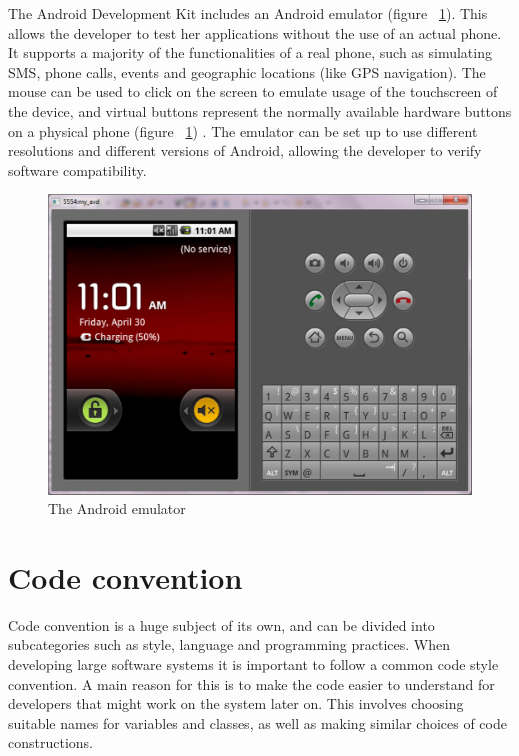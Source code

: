 The Android Development Kit includes an Android emulator (figure ~\ref{fig:androidEmulator}). This allows the developer to test her applications without the use of an actual phone. It supports a majority of the functionalities of a real phone, such as simulating SMS, phone calls, events and geographic locations (like GPS navigation). The mouse can be used to click on the screen to emulate usage of the touchscreen of the device, and virtual buttons represent the normally available hardware buttons on a physical phone (figure ~\ref{fig:androidEmulator}) . The emulator can be set up to use different resolutions and different versions of Android, allowing the developer to verify software compatibility. \citep{Android}

\begin{figure}[here]
\begin{center}
\includegraphics[scale=0.4]{pics/chapters/chapter2/emulator}
\end{center}
\caption{The Android emulator}
\label{fig:androidEmulator}
\end{figure}

\section{Code convention}

Code convention is a huge subject of its own, and can be divided into subcategories such as style, language and programming practices. When developing large software systems it is important to follow a common code style convention. A main reason for this is to make the code easier to understand for developers that might work on the system later on. This involves choosing suitable names for variables and classes, as well as making similar choices of code constructions. 

